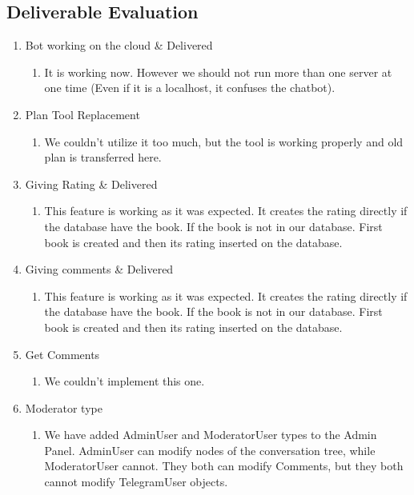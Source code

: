 \documentclass[a4paper]{article}
\begin{document}
\subsection{Deliverable Evaluation}
\begin{enumerate}
\item Bot working on the cloud \& Delivered 
\begin{enumerate}
  \item It is working now. However we should not run more than one server at one time (Even if it is a localhost, it confuses the chatbot).
   \end{enumerate}
   \item Plan Tool Replacement
   \begin{enumerate}
    \item We couldn't utilize it too much, but the tool is working properly and old plan is transferred here.
     \end{enumerate}
   \item Giving Rating \& Delivered 
   \begin{enumerate}
    \item This feature is working as it was expected. It creates the rating directly if the database have the book. If the book is not in our database. First book is created and then its rating inserted on the database.
   \end{enumerate}
   \item Giving comments \& Delivered \\
   \begin{enumerate}
   \item This feature is working as it was expected. It creates the rating directly if the database have the book. If the book is not in our database. First book is created and then its rating inserted on the database.
 	\end{enumerate}
 	\item 	Get Comments
 	\begin{enumerate}
 \item We couldn't implement this one.
 	\end{enumerate}
 	\item 	Moderator type
 	\begin{enumerate}
 	\item We have added AdminUser and ModeratorUser types to the Admin Panel. AdminUser can modify nodes of the conversation tree, while ModeratorUser cannot. They both can modify Comments, but they both cannot modify TelegramUser objects.
 	\end{enumerate}

\end{enumerate}
\end{document}
